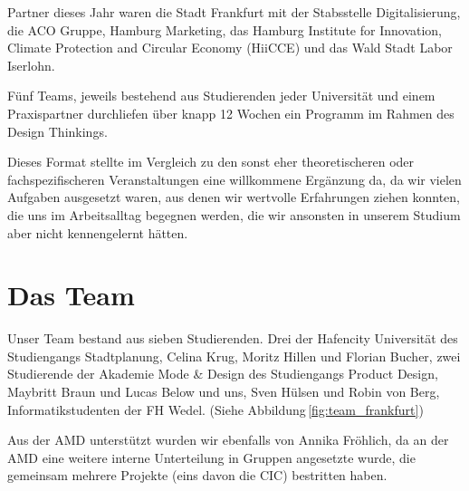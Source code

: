     Partner dieses Jahr waren die Stadt Frankfurt mit der Stabsstelle Digitalisierung, die ACO Gruppe, Hamburg Marketing, das Hamburg Institute for Innovation, Climate Protection and Circular Economy (HiiCCE) und das Wald Stadt Labor Iserlohn.

    Fünf Teams, jeweils bestehend aus Studierenden jeder Universität und einem Praxispartner durchliefen über knapp 12 Wochen ein Programm im Rahmen des Design Thinkings.

    Dieses Format stellte im Vergleich zu den sonst eher theoretischeren oder fachspezifischeren Veranstaltungen eine willkommene Ergänzung da, da wir vielen Aufgaben ausgesetzt waren, aus denen wir wertvolle Erfahrungen ziehen konnten, die uns im Arbeitsalltag begegnen werden, die wir ansonsten in unserem Studium aber nicht kennengelernt hätten.

\section{Das Team}

        Unser Team bestand aus sieben Studierenden. Drei der Hafencity Universität des Studiengangs Stadtplanung, Celina Krug, Moritz Hillen und Florian Bucher, zwei Studierende der Akademie Mode \& Design des Studiengangs Product Design, Maybritt Braun und Lucas Below und uns, Sven Hülsen und Robin von Berg, Informatikstudenten der FH Wedel. (Siehe Abbildung\,\ref{fig:team_frankfurt})

        Aus der AMD unterstützt wurden wir ebenfalls von Annika Fröhlich, da an der AMD eine weitere interne Unterteilung in Gruppen angesetzte wurde, die gemeinsam mehrere Projekte (eins davon die CIC) bestritten haben.

